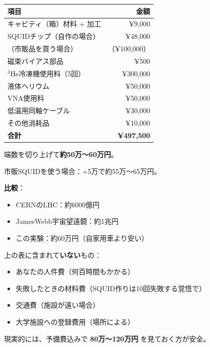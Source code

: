 \documentclass[12pt,a4paper]{article}
\begin{document}
\begin{kanenobox}[費用内訳]
\begin{center}
\renewcommand{\arraystretch}{1.4}
\begin{tabular}{lr}
\toprule
項目 & 金額 \\
\midrule
キャビティ（箱）材料 + 加工 & ¥9,000 \\
SQUIDチップ（自作の場合） & ¥48,000 \\
\quad（市販品を買う場合） & \quad（¥100,000） \\
磁束バイアス部品 & ¥500 \\
$^3$He冷凍機使用料（5回） & ¥300,000 \\
液体ヘリウム & ¥50,000 \\
VNA使用料 & ¥50,000 \\
低温用同軸ケーブル & ¥30,000 \\
その他消耗品 & ¥10,000 \\
\midrule
\textbf{合計} & \textbf{¥497,500} \\
\bottomrule
\end{tabular}
\end{center}

端数を切り上げて\textbf{約50万〜60万円}。

市販SQUIDを使う場合：+5万で約55万〜65万円。

\textbf{比較}：
\begin{itemize}
\item CERNのLHC：約6000億円
\item JamesWebb宇宙望遠鏡：約1兆円
\item この実験：約60万円（自家用車より安い）
\end{itemize}
\end{kanenobox}

\begin{honestbox}[隠れコストに注意]
上の表に含まれて\textbf{いない}もの：
\begin{itemize}
\item あなたの人件費（何百時間もかかる）
\item 失敗したときの材料費（SQUID作りは10回失敗する覚悟で）
\item 交通費（施設が遠い場合）
\item 大学施設への登録費用（場所による）
\end{itemize}
現実的には、予備費込みで \textbf{80万〜120万円} を見ておく方が安全。
\end{honestbox}

\end{document}
